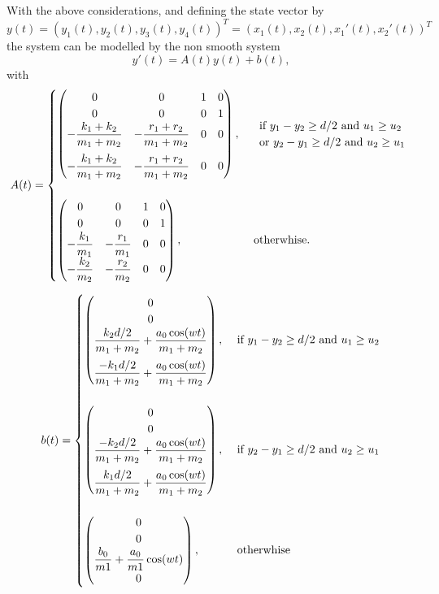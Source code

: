 \documentclass{article}
\begin{document}
\begin{description}
With the above considerations, and defining the state vector by
$y(t)=(y_1(t), y_2(t), y_3(t), y_4(t))^T = (x_1(t), x_2(t), x_1'(t), x_2'(t))^T$
the system can be modelled by the non smooth system
\[
y'(t)= A(t) y(t) + b(t),
\]
with
\[
A(t)=\begin{cases}
\begin{pmatrix}0 & 0 & 1 & 0 \\ 0 & 0 & 0 & 1 \\
-\dfrac{k_1+k_2}{m_1+m_2} & -\dfrac{r_1+r_2}{m_1+m_2} & 0 & 0 \\[10pt]
-\dfrac{k_1+k_2}{m_1+m_2} & -\dfrac{r_1+r_2}{m_1+m_2} & 0 & 0\end{pmatrix},
&
\begin{array}{l}
\hbox{ if }  y_1-y_2 \ge d/2 \hbox{ and } u_1 \ge u_2 \\
\hbox{ or }
y_2-y_1 \ge d/2 \hbox{ and } u_2 \ge u_1
\end{array}
\\[50pt]
\begin{pmatrix}0 & 0 & 1 & 0 \\ 0 & 0 & 0 & 1 \\
-\dfrac{k_1}{m_1} & -\dfrac{r_1}{m_1} & 0 & 0 \\ -\dfrac{k_2}{m_2} & -\dfrac{r_2}{m_2} & 0 & 0\end{pmatrix},
&  \hbox{ otherwhise. }
\end{cases}
\]

\[
b(t)=\begin{cases}
\begin{pmatrix}0\\0\\ \dfrac{k_2 d/2}{m_1+m_2}+\dfrac{a_0 \cos(w t)}{m_1+m_2}  \\[10pt]
\dfrac{-k_1 d/2}{m_1+m_2}+\dfrac{a_0 \cos(w t)}{m_1+m_2}  \end{pmatrix},
&  \hbox{ if }  y_1-y_2 \ge d/2 \hbox{ and } u_1 \ge u_2
\\[50pt]
\begin{pmatrix}0\\0\\ \dfrac{-k_2 d/2}{m_1+m_2}+\dfrac{a_0 \cos(w t)}{m_1+m_2}  \\[10pt]
\dfrac{k_1 d/2}{m_1+m_2}+\dfrac{a_0 \cos(w t)}{m_1+m_2}  \end{pmatrix},
&  \hbox{ if } y_2-y_1 \ge d/2 \hbox{ and } u_2 \ge u_1
\\[50pt]
\begin{pmatrix}0\\0\\ \dfrac{b_0}{m1}+\dfrac{a_0}{m1}\cos(w t) \\0  \end{pmatrix},
&  \hbox{ otherwhise }
\end{cases}
\]


\end{description}
\end{document}
